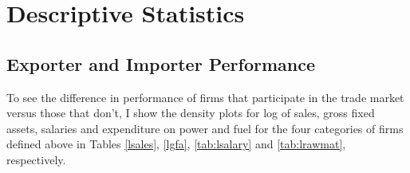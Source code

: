 \documentclass[12pt]{article}
\begin{document}
\begin{center}

\end{center}
\section{Descriptive Statistics}\label{sec:desc}
\subsection{Exporter and Importer Performance}
To see the difference in performance of firms that participate in the trade market
versus those that don't, I show the density plots for log of sales, gross fixed assets,
salaries and expenditure on power and fuel for the four categories of
firms defined above in  
Tables \ref{lsales}, \ref{lgfa}, \ref{tab:lsalary} and
\ref{tab:lrawmat}, respectively. 
\end{document}

